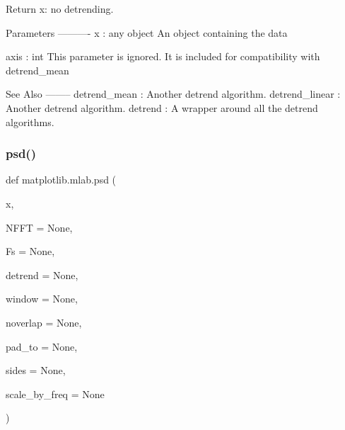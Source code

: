 \begin{DoxyVerb}Return x: no detrending.

Parameters
----------
x : any object
    An object containing the data

axis : int
    This parameter is ignored.
    It is included for compatibility with detrend_mean

See Also
--------
detrend_mean : Another detrend algorithm.
detrend_linear : Another detrend algorithm.
detrend : A wrapper around all the detrend algorithms.
\end{DoxyVerb}
 \mbox{\label{namespacematplotlib_1_1mlab_ac7e214a07b5569a236ed4a255e7d703d}} 
\subsubsection{\texorpdfstring{psd()}{psd()}}
{\footnotesize\ttfamily def matplotlib.\+mlab.\+psd (\begin{DoxyParamCaption}\item[{}]{x,  }\item[{}]{N\+F\+FT = {\ttfamily None},  }\item[{}]{Fs = {\ttfamily None},  }\item[{}]{detrend = {\ttfamily None},  }\item[{}]{window = {\ttfamily None},  }\item[{}]{noverlap = {\ttfamily None},  }\item[{}]{pad\+\_\+to = {\ttfamily None},  }\item[{}]{sides = {\ttfamily None},  }\item[{}]{scale\+\_\+by\+\_\+freq = {\ttfamily None} }\end{DoxyParamCaption})}

